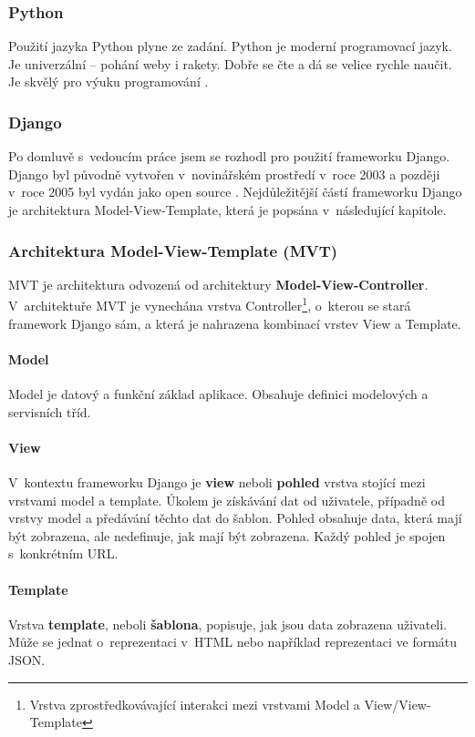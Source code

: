 \subsubsection{Python}
Použití jazyka Python plyne ze zadání. Python je moderní programovací jazyk. Je univerzální – pohání weby i rakety. Dobře se čte a dá se velice rychle naučit. Je skvělý pro výuku programování \cite{python-cz}.

\subsubsection{Django}
Po domluvě s~vedoucím práce jsem se rozhodl pro použití frameworku Django. Django byl původně vytvořen v~novinářském prostředí v~roce 2003 a později v~roce 2005 byl vydán jako open source \cite{djangobook, django-cr}. Nejdůležitější částí frameworku Django je architektura Model-View-Template, která je popsána v~následující kapitole.

\subsubsection{Architektura Model-View-Template (MVT)}
MVT je architektura odvozená od architektury \textbf{Model-View-Controller}. V~architektuře MVT je vynechána vrstva Controller\footnote{Vrstva zprostředkovávající interakci mezi vrstvami Model a View/View-Template}, o~kterou se stará framework Django sám, a která je nahrazena kombinací vrstev View a Template.

\paragraph*{Model}
Model je datový a funkční základ aplikace. Obsahuje definici modelových a servisních tříd.
\paragraph*{View}
V~kontextu frameworku Django je \textbf{view} neboli \textbf{pohled} vrstva stojící mezi vrstvami model a template. Úkolem je získávání dat od uživatele, případně od vrstvy model a předávání těchto dat do šablon. Pohled obsahuje data, která mají být zobrazena, ale nedefinuje, jak mají být zobrazena. Každý pohled je spojen s~konkrétním URL.
\paragraph*{Template}
Vrstva \textbf{template}, neboli \textbf{šablona}, popisuje, jak jsou data zobrazena uživateli. Může se jednat o~reprezentaci v~HTML nebo například reprezentaci ve formátu JSON.